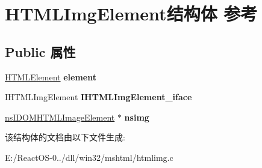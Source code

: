 \hypertarget{struct_h_t_m_l_img_element}{}\section{H\+T\+M\+L\+Img\+Element结构体 参考}
\label{struct_h_t_m_l_img_element}
\subsection*{Public 属性}
\begin{DoxyCompactItemize}
\item 
\mbox{\label{struct_h_t_m_l_img_element_a952c92005a8cfeb0f9c99ab89b5a1bcb}} 
\hyperlink{struct_h_t_m_l_element}{H\+T\+M\+L\+Element} {\bfseries element}
\item 
\mbox{\label{struct_h_t_m_l_img_element_ad4557555faab6f6bfe4413f0956559c0}} 
I\+H\+T\+M\+L\+Img\+Element {\bfseries I\+H\+T\+M\+L\+Img\+Element\+\_\+iface}
\item 
\mbox{\label{struct_h_t_m_l_img_element_ad7662d69e49d5a510aa32fb3ae0e4e73}} 
\hyperlink{interfacens_i_d_o_m_h_t_m_l_image_element}{ns\+I\+D\+O\+M\+H\+T\+M\+L\+Image\+Element} $\ast$ {\bfseries nsimg}
\end{DoxyCompactItemize}


该结构体的文档由以下文件生成\+:\begin{DoxyCompactItemize}
\item 
E\+:/\+React\+O\+S-\/0../dll/win32/mshtml/htmlimg.\+c\end{DoxyCompactItemize}
